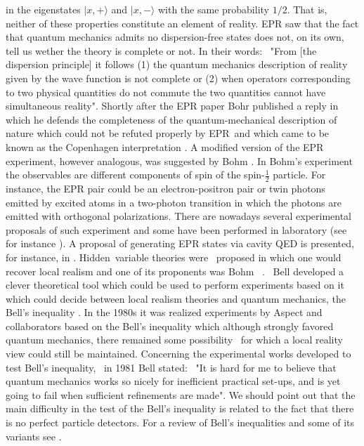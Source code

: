\documentclass[12pt,thmsa]{article}
\begin{document}
in the eigenstates $|x,+\rangle $ and $|x,-\rangle $ with the same
probability $1/2$. That is, neither of these properties constitute an
element of reality. EPR saw that the fact that quantum mechanics admits no
dispersion-free states does not, on its own, tell us wether the theory is
complete or not. In their words: \ "From [the dispersion principle] it
follows (1) the quantum mechanics description of reality given by the wave
function is not complete or (2) when operators corresponding to two physical
quantities do not commute the two quantities cannot have simultaneous
reality". Shortly after the EPR paper Bohr published a reply in which he
defends the completeness of the quantum-mechanical description of nature
which could not be refuted properly by EPR\ and which came to be known as
the Copenhagen interpretation \cite{BohrEPRreply}. A modified version of the
EPR experiment, however analogous, was suggested by Bohm \cite{BohmEPR,
Omnes, Hughes}. In Bohm's experiment the observables are different
components of spin of the spin-$\frac{1}{2}$ particle. For instance, the EPR
pair could be an electron-positron pair or twin photons emitted by excited
atoms in a two-photon transition in which the photons are emitted with
orthogonal polarizations. There are nowadays several experimental proposals
of such experiment and some have been performed in laboratory (see for
instance \cite{Zeilinger}). A proposal of generating EPR states via cavity
QED is presented, for instance, in \cite{GHZWalther, RevHaroche}. Hidden\
variable theories \cite{Omnes, Hughes} were \ proposed in which one would
recover local realism and one of its proponents was Bohm \ \cite{Bohmhvt,
Omnes, Hughes}. \ Bell developed a clever theoretical tool which could be
used to perform experiments based on it which could decide between local
realism theories and quantum mechanics, the Bell's inequality \cite{Bell,
Omnes, Hughes, WallsMilburn}. In the 1980s it was realized experiments by
Aspect and collaborators \cite{Aspect, WallsMilburn} based on the Bell's
inequality which although strongly favored quantum mechanics, there remained
some possibility \ for which a local reality view could still be maintained.
Concerning the experimental works developed to test Bell's inequality, \ in
1981 Bell stated: \ "It is hard for me to believe that quantum mechanics
works so nicely for inefficient practical set-ups, and is yet going to fail
when sufficient refinements are made". We should point out that the main
difficulty in the test of the Bell's inequality is related to the fact that
there is no perfect particle detectors. For a review of Bell's inequalities
and some of its variants see \cite{RevBellsIneq}.
\end{document}

